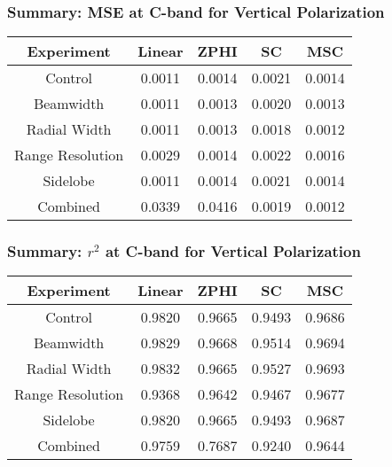 \begin{frame}
    \frametitle{Summary: MSE at C-band for Vertical Polarization}
    \begin{center}
        \begin{tabular}{| c | c | c | c | c |}
            \hline
            Experiment & Linear & ZPHI & SC & MSC \\
            \hline
            \hline
            Control & 0.0011 & 0.0014 & 0.0021 & 0.0014 \\
            Beamwidth & 0.0011 & 0.0013 & 0.0020 & 0.0013 \\
            Radial Width & 0.0011 & 0.0013 & 0.0018 & 0.0012 \\
            Range Resolution & 0.0029 & 0.0014 & 0.0022 & 0.0016 \\
            Sidelobe & 0.0011 & 0.0014 & 0.0021 & 0.0014 \\
            Combined & 0.0339 & 0.0416 & 0.0019 & 0.0012 \\
            \hline
        \end{tabular}
    \end{center}
\end{frame}

\begin{frame}
    \frametitle{Summary: $r^2$ at C-band for Vertical Polarization}
    \begin{center}
        \begin{tabular}{| c | c | c | c | c |}
            \hline
            Experiment & Linear & ZPHI & SC & MSC \\
            \hline
            \hline
            Control & 0.9820 & 0.9665 & 0.9493 & 0.9686 \\
            Beamwidth & 0.9829 & 0.9668 & 0.9514 & 0.9694 \\
            Radial Width & 0.9832 & 0.9665 & 0.9527 & 0.9693 \\
            Range Resolution & 0.9368 & 0.9642 & 0.9467 & 0.9677 \\
            Sidelobe & 0.9820 & 0.9665 & 0.9493 & 0.9687 \\
            Combined & 0.9759 & 0.7687 & 0.9240 & 0.9644 \\
            \hline
        \end{tabular}
    \end{center}
\end{frame}

